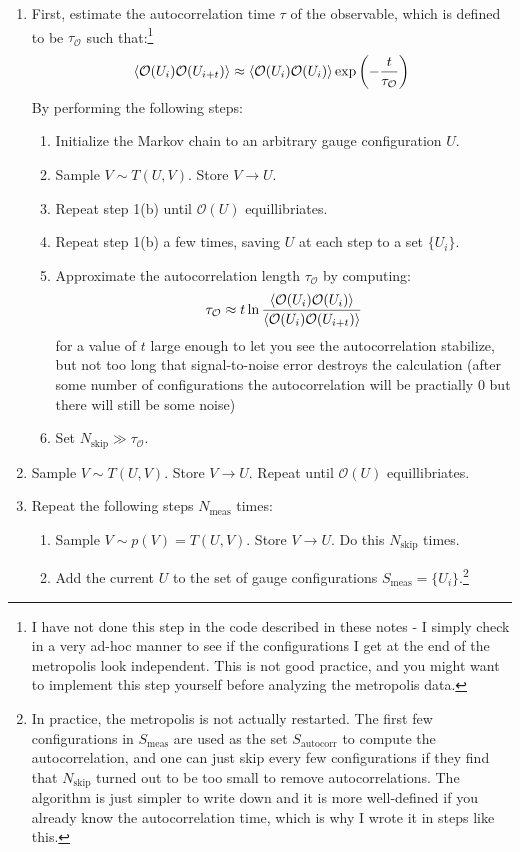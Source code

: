 \documentclass[11pt]{article}
\begin{document}
\begin{enumerate}
\item First, estimate the autocorrelation time $\tau$ of the observable, which is defined to be $\tau_\mathcal O$ such that:\footnote{I have not done this step in the code described in these notes - I simply check in a very ad-hoc manner to see if the configurations I get at the end of the metropolis look independent. This is not good practice, and you might want to implement this step yourself before analyzing the metropolis data.}
\begin{equation}\braket{\mathcal O(U_i)\mathcal O(U_{i+t})}\approx \braket{\mathcal O(U_i)\mathcal O(U_{i})}\exp\left(-\frac{t}{\tau_\mathcal O}\right)\end{equation}
By performing the following steps:
	\begin{enumerate}
	\item Initialize the Markov chain to an arbitrary gauge configuration $U$.
	\item Sample $V\sim T(U,V)$. Store $V\to U$.
	\item Repeat step 1(b) until $\mathcal O(U)$ equillibriates.
	\item Repeat step 1(b) a few times, saving $U$ at each step to a set $\{U_i\}$.
	\item Approximate the autocorrelation length $\tau_{\mathcal O}$ by computing:
	\begin{equation}\tau_\mathcal O\approx t\ln\frac{\braket{\mathcal O(U_i)\mathcal O(U_{i})}}{\braket{\mathcal O(U_i)\mathcal O(U_{i+t})}}\end{equation}
	for a value of $t$ large enough to let you see the autocorrelation stabilize, but not too long that signal-to-noise error destroys the calculation (after some number of configurations the autocorrelation will be practially 0 but there will still be some noise)
	\item Set $N_{\mathrm{skip}}\gg \tau_{\mathcal O}$.
	\end{enumerate}
\item Sample $V\sim T(U,V)$. Store $V\to U$. Repeat until $\mathcal O(U)$ equillibriates.
\item Repeat the following steps $N_{\mathrm{meas}}$ times:
\begin{enumerate}
	\item Sample $V\sim p(V)=T(U,V)$. Store $V\to U$. Do this $N_{\mathrm{skip}}$ times. 
	\item Add the current $U$ to the set of gauge configurations $S_{\mathrm{meas}}=\{U_i\}$.\footnote{In practice, the metropolis is not actually restarted. The first few configurations in $S_{\mathrm{meas}}$ are used as the set $S_{\mathrm{autocorr}}$ to compute the autocorrelation, and one can just skip every few configurations if they find that $N_\mathrm{skip}$ turned out to be too small to remove autocorrelations. The algorithm is just simpler to write down and it is more well-defined if you already know the autocorrelation time, which is why I wrote it in steps like this.}
\end{enumerate}
\end{enumerate}
\end{document}
